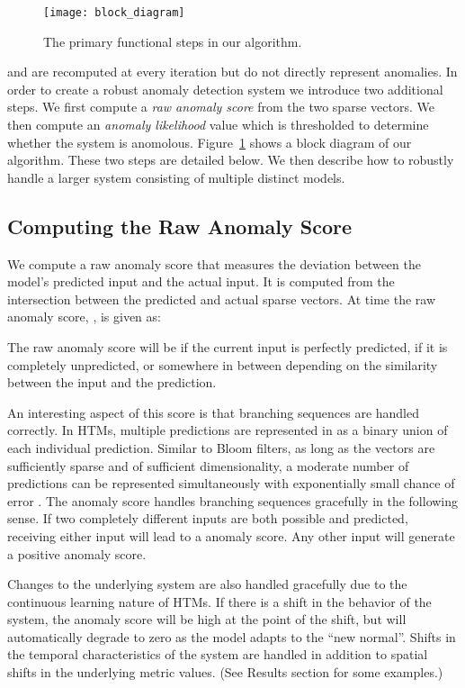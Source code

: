 \documentclass{article}
\begin{document}
\begin{figure}[ht]
\vskip 0.2in
\begin{center}
\centerline{\texttt{[image: block\_diagram]}}
\caption{The primary functional steps in our algorithm.}
\label{block-diagram}
\end{center}
\vskip -0.2in
\end{figure}

 and  are
recomputed at every iteration but do not directly represent anomalies. In order
to create a robust anomaly detection system we introduce two additional steps.
We first compute a {\em raw anomaly score} from the two sparse vectors. We then
compute an {\em anomaly likelihood} value which is thresholded to determine
whether the system is anomolous. Figure~\ref{block-diagram} shows a block
diagram of our algorithm.  These two steps are detailed below.  We then describe
how to robustly handle a larger system consisting of multiple distinct models.

\subsection{Computing the Raw Anomaly Score}
We compute a raw anomaly score that measures the deviation between the model's
predicted input and the actual input. It is computed from the
intersection between the predicted and actual sparse vectors. At time  the
raw anomaly score, , is given as:



The raw anomaly score will be  if the current input is perfectly predicted,
 if it is completely unpredicted, or somewhere in between depending on the
similarity between the input and the prediction.

An interesting aspect of this score is that branching sequences are handled
correctly. In HTMs, multiple predictions are represented in
 as a binary union of each individual
prediction. Similar to Bloom filters, as long as the vectors are sufficiently
sparse and of sufficient dimensionality, a moderate number of predictions can be
represented simultaneously with exponentially small chance of error
\cite{Bloom1970,Ahmad2016}. The anomaly score handles branching sequences
gracefully in the following sense. If two completely different inputs are both
possible and predicted, receiving either input will lead to a  anomaly score.
Any other input will generate a positive anomaly score.

Changes to the underlying system are also handled gracefully due to the
continuous learning nature of HTMs. If there is a shift in the behavior of the
system, the anomaly score will be high at the point of the shift, but will
automatically degrade to zero as the model adapts to the ``new normal''. Shifts
in the temporal characteristics of the system are handled in addition to
spatial shifts in the underlying metric values. (See Results section for
some examples.)
\end{document}

